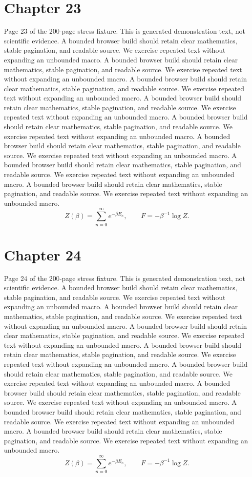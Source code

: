 \documentclass[11pt]{article}
\begin{document}
\section*{Chapter 23}
Page 23 of the 200-page stress fixture. This is generated demonstration text, not scientific evidence.
A bounded browser build should retain clear mathematics, stable pagination, and readable source. We exercise repeated text without expanding an unbounded macro.
A bounded browser build should retain clear mathematics, stable pagination, and readable source. We exercise repeated text without expanding an unbounded macro.
A bounded browser build should retain clear mathematics, stable pagination, and readable source. We exercise repeated text without expanding an unbounded macro.
A bounded browser build should retain clear mathematics, stable pagination, and readable source. We exercise repeated text without expanding an unbounded macro.
A bounded browser build should retain clear mathematics, stable pagination, and readable source. We exercise repeated text without expanding an unbounded macro.
A bounded browser build should retain clear mathematics, stable pagination, and readable source. We exercise repeated text without expanding an unbounded macro.
A bounded browser build should retain clear mathematics, stable pagination, and readable source. We exercise repeated text without expanding an unbounded macro.
A bounded browser build should retain clear mathematics, stable pagination, and readable source. We exercise repeated text without expanding an unbounded macro.
\[Z(\beta)=\sum_{n=0}^{\infty}e^{-\beta E_n},\qquad F=-\beta^{-1}\log Z.\]
\newpage
\section*{Chapter 24}
Page 24 of the 200-page stress fixture. This is generated demonstration text, not scientific evidence.
A bounded browser build should retain clear mathematics, stable pagination, and readable source. We exercise repeated text without expanding an unbounded macro.
A bounded browser build should retain clear mathematics, stable pagination, and readable source. We exercise repeated text without expanding an unbounded macro.
A bounded browser build should retain clear mathematics, stable pagination, and readable source. We exercise repeated text without expanding an unbounded macro.
A bounded browser build should retain clear mathematics, stable pagination, and readable source. We exercise repeated text without expanding an unbounded macro.
A bounded browser build should retain clear mathematics, stable pagination, and readable source. We exercise repeated text without expanding an unbounded macro.
A bounded browser build should retain clear mathematics, stable pagination, and readable source. We exercise repeated text without expanding an unbounded macro.
A bounded browser build should retain clear mathematics, stable pagination, and readable source. We exercise repeated text without expanding an unbounded macro.
A bounded browser build should retain clear mathematics, stable pagination, and readable source. We exercise repeated text without expanding an unbounded macro.
\[Z(\beta)=\sum_{n=0}^{\infty}e^{-\beta E_n},\qquad F=-\beta^{-1}\log Z.\]
\newpage
\end{document}
